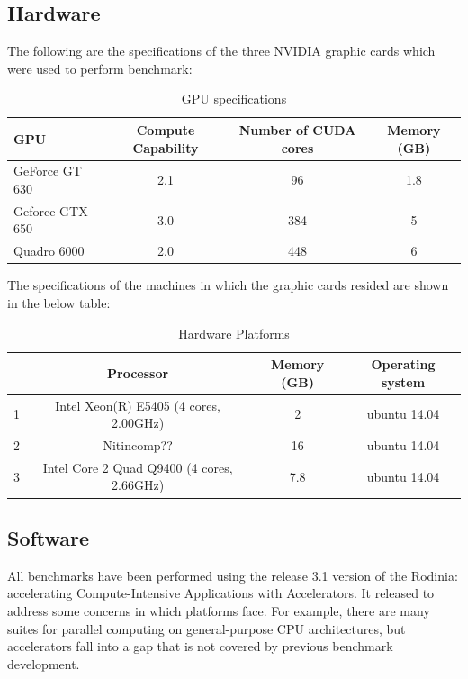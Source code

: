\documentclass[paper=a4, fontsize=11pt]{scrartcl}
\numberwithin{equation}{section}		%
\numberwithin{figure}{section}			%
\numberwithin{table}{section}				%
\begin{document}
\subsection{Hardware}
The following are the specifications of the three NVIDIA graphic cards which were used to perform benchmark:

\begin{table}[!h]
\caption{GPU specifications}
\centering
\begin{tabular}{|l| c| c| c|}
	\hline
	GPU & Compute Capability & Number of CUDA cores & Memory (GB)\\
	\hline
    GeForce GT 630 & 2.1 & 96 & 1.8  \\
	\hline
    Geforce GTX 650 & 3.0 & 384 & 5 \\
	\hline
    Quadro 6000 & 2.0 & 448 & 6 \\
	\hline
\end{tabular}
\label{table1}
\end{table}

The specifications of the machines in which the graphic cards resided are shown in the below table:

\begin{table}[!h]
\caption{Hardware Platforms}
\centering
\begin{tabular}{| c| c| c| c|}
	\hline
	  & Processor & Memory (GB)& Operating system\\
	\hline
    1  & Intel Xeon(R) E5405 (4 cores, 2.00GHz) & 2& ubuntu 14.04 \\
	\hline
    2  & Nitincomp?? & 16 & ubuntu 14.04 \\
	\hline
    3  & Intel Core 2 Quad Q9400 (4 cores, 2.66GHz) & 7.8& ubuntu 14.04 \\
	\hline
\end{tabular}
\label{table2}
\end{table}

\newpage
\clearpage
\subsection{Software}
All benchmarks have been performed using the release 3.1 version of the Rodinia: accelerating Compute-Intensive Applications with Accelerators. It released to address some concerns in  which platforms face. For example, there are many suites for parallel computing on general-purpose CPU architectures, but accelerators fall into a gap that is not covered by previous benchmark development.

\newpage
\clearpage
\end{document}
